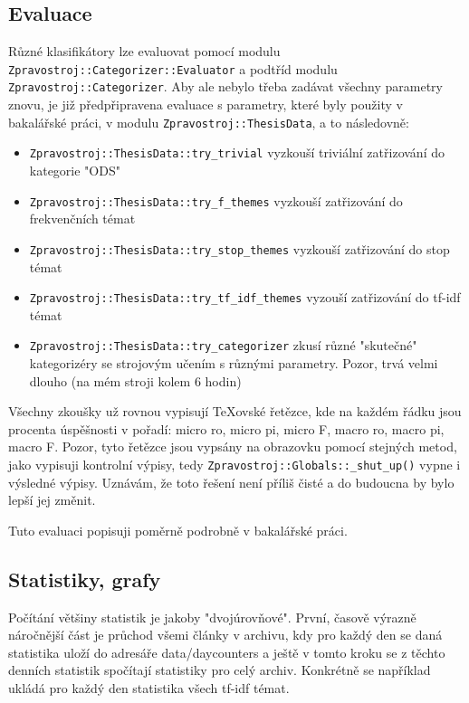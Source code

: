 \documentclass[12pt,a4paper]{report}
\begin{document}
\subsection{Evaluace}

Různé klasifikátory lze evaluovat pomocí modulu \texttt{Zpravostroj::Categorizer::Evaluator} a podtříd modulu \texttt{Zpravostroj::Categorizer}. Aby ale nebylo třeba zadávat všechny parametry znovu, je již předpřipravena evaluace s parametry, které byly použity v bakalářské práci, v modulu \texttt{Zpravostroj::ThesisData}, a to následovně:

\begin{itemize}
	\item \texttt{Zpravostroj::ThesisData::try\_trivial} vyzkouší triviální zatřizování do kategorie "ODS"
	\item \texttt{Zpravostroj::ThesisData::try\_f\_themes} vyzkouší zatřizování do frekvenčních témat
	\item \texttt{Zpravostroj::ThesisData::try\_stop\_themes} vyzkouší zatřizování do stop témat
	\item \texttt{Zpravostroj::ThesisData::try\_tf\_idf\_themes} vyzouší zatřizování do tf-idf témat
	\item \texttt{Zpravostroj::ThesisData::try\_categorizer} zkusí různé "skutečné" kategorizéry se strojovým učením s různými parametry. Pozor, trvá velmi dlouho (na mém stroji kolem 6 hodin)
\end{itemize}
Všechny zkoušky už rovnou vypisují TeXovské řetězce, kde na každém řádku jsou procenta úspěšnosti v pořadí: micro ro, micro pi, micro F, macro ro, macro pi, macro F. Pozor, tyto řetězce jsou vypsány na obrazovku pomocí stejných metod, jako vypisuji kontrolní výpisy, tedy \texttt{Zpravostroj::Globals::\_shut\_up()} vypne i výsledné výpisy. Uznávám, že toto řešení není příliš čisté a do budoucna by bylo lepší jej změnit.

Tuto evaluaci popisuji poměrně podrobně v bakalářské práci.

\subsection{Statistiky, grafy}

Počítání většiny statistik je jakoby "dvojúrovňové". První, časově výrazně náročnější část je průchod všemi články v archivu, kdy pro každý den se daná statistika uloží do adresáře data/daycounters a ještě v tomto kroku se z těchto denních statistik spočítají statistiky pro celý archiv. Konkrétně se například ukládá pro každý den statistika všech tf-idf témat.
\end{document}
